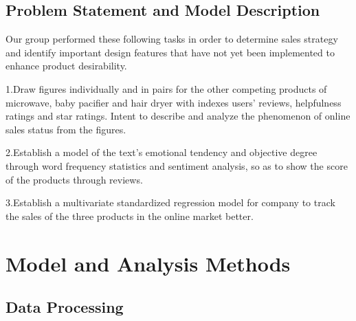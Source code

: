 \documentclass[12pt]{article}
\begin{document}
\subsection{Problem Statement and Model Description}
\quad\par\par
Our group performed these following tasks in order to determine sales strategy and identify important design features that have not yet been implemented to enhance product desirability.
\par
1.Draw figures individually and in pairs for the other competing products of microwave, baby pacifier and hair dryer with indexes users' reviews, helpfulness ratings and star ratings. Intent to describe and analyze the phenomenon of online sales status from the figures.
\par
2.Establish a model of the text's emotional tendency and objective degree through word frequency statistics and sentiment analysis, so as to show the score of the products through reviews.
\par
3.Establish a multivariate standardized regression model for company to track the sales of the three products in the online market better.

\section{Model and Analysis Methods}
\subsection{Data Processing}
\end{document}
